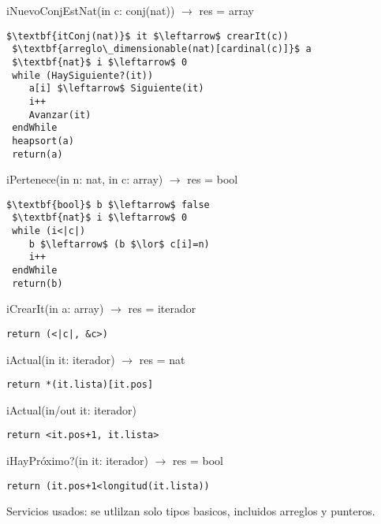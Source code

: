 	
iNuevoConjEstNat(in c: conj(nat)) $\rightarrow$ res = array
\begin{lstlisting}[mathescape]
 $\textbf{itConj(nat)}$ it $\leftarrow$ crearIt(c))
 $\textbf{arreglo\_dimensionable(nat)[cardinal(c)]}$ a 
 $\textbf{nat}$ i $\leftarrow$ 0
 while (HaySiguiente?(it))
 	a[i] $\leftarrow$ Siguiente(it)
 	i++
 	Avanzar(it)
 endWhile
 heapsort(a)
 return(a)
\end{lstlisting}
	
iPertenece(in n: nat, in c: array) $\rightarrow$ res = bool
\begin{lstlisting}[mathescape]
 $\textbf{bool}$ b $\leftarrow$ false
 $\textbf{nat}$ i $\leftarrow$ 0
 while (i<|c|)
 	b $\leftarrow$ (b $\lor$ c[i]=n)
 	i++
 endWhile
 return(b)
\end{lstlisting}
	
iCrearIt(in a: array) $\rightarrow$ res = iterador
\begin{lstlisting}[mathescape]
 return (<|c|, &c>)
\end{lstlisting}

iActual(in it: iterador) $\rightarrow$ res = nat
\begin{lstlisting}[mathescape]
 return *(it.lista)[it.pos]
\end{lstlisting}

iActual(in/out it: iterador)
\begin{lstlisting}[mathescape]
 return <it.pos+1, it.lista>
\end{lstlisting}

iHayPr\'oximo?(in it: iterador) $\rightarrow$ res = bool
\begin{lstlisting}[mathescape]
 return (it.pos+1<longitud(it.lista))
\end{lstlisting}

Servicios usados: se utlilzan solo tipos basicos, incluidos arreglos y punteros.

